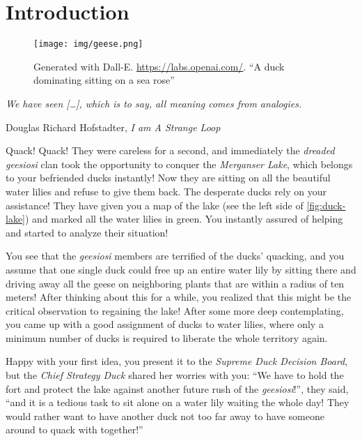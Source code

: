 \chapter{Introduction}\label{ch:introduction}

\vspace*{-50pt}

\begin{figure}[ht]
        \texttt{[image: img/geese.png]}
        \captionsetup{textformat=empty,labelformat=blank}
        \caption[Generated with Dalle-E. Knowledge Cutoff 09-2022]{Generated with Dall-E. \url{https://labs.openai.com/}. ``A duck dominating sitting on a sea rose''}
\end{figure}

\epigraph{\itshape We have seen [\ldots], which is to say, all meaning comes from analogies.}{Douglas Richard Hofstadter, \textit{I am A Strange Loop}}

Quack! Quack! They were careless for a second, and immediately the \textit{dreaded geesiosi} clan took the opportunity to conquer the  \textit{Merganser Lake}, which belongs to your befriended ducks instantly!
Now they are sitting on all the beautiful water lilies and refuse to give them back. The desperate ducks rely on your assistance!
They have given you a map of the lake (see the left side of \cref{fig:duck-lake}) and marked all the water lilies in green.
You instantly assured of helping and started to analyze their situation!

You see that the \textit{geesiosi} members are terrified of the ducks' quacking, and you assume that one single duck could free up an entire water lily by sitting there and driving away all the geese on neighboring plants that are within a radius of ten meters! 
After thinking about this for a while, you realized that this might be the critical observation to regaining the lake!
After some more deep contemplating, you came up with a good assignment of ducks to water lilies, where only a minimum number of ducks is required to liberate the whole territory again.

Happy with your first idea, you present it to the \textit{Supreme Duck Decision Board}, but the \textit{Chief Strategy Duck} shared her worries with you: 
``We have to hold the fort and protect the lake against another future rush of the \textit{geesiosi}!'', they said, ``and it is a tedious task to sit alone on a water lily waiting the whole day! They would rather want to have another duck not too far away to have someone around to quack with together!''

